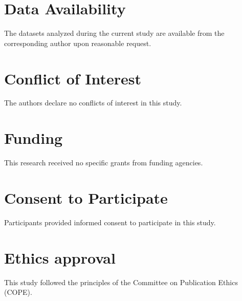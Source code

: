 \documentclass[10pt]{NSP1}
\begin{document}
	\section*{Data Availability}
	The datasets analyzed during the current study are available from the corresponding author upon reasonable request.
	
	\section*{Conflict of Interest}
	The authors declare no conflicts of interest in this study.
	
	\section*{Funding}
	This research received no specific grants from funding agencies.
	
	\section*{Consent to Participate}
	Participants provided informed consent to participate in this study.
	
	\section*{Ethics approval}
	This study followed the principles of the Committee on Publication Ethics (COPE).
	
\end{document}
